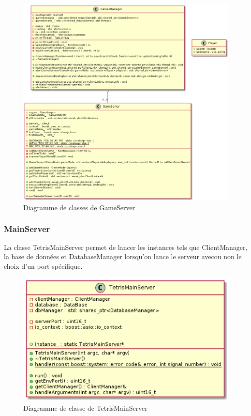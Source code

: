 \documentclass{article}
\begin{document}
\begin{figure}[H]
	\centering
	 \includegraphics[scale=0.4]{../../res/uml/class/GameServerClass.png}
	 \caption{Diagramme de classes de GameServer}
	 \label{fig:GameServerDiagram}
\end{figure}

\subsubsection{MainServer}

La classe TetrisMainServer permet de lancer les instances tels que ClientManager, la base de données et DatabaseManager lorsqu'on lance le serveur avecou non le choix d'un port spécifique. 

\begin{figure}[H]
	\centering
	 \includegraphics[scale=0.3]{../../res/uml/class/MainServerClass.png}
	 \caption{Diagramme de classe de TetrisMainServer}
	 \label{fig:GameServerDiagram}
\end{figure}
\end{document}
